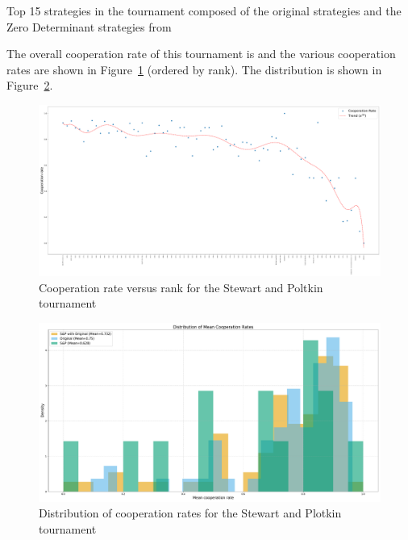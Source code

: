 \documentclass{article}
\begin{document}
\begin{table}[!hbtp]
        \centering
        \scriptsize
        
        \caption{Top 15 strategies in the tournament composed of the original
                 strategies and the Zero Determinant strategies
                 from~\cite{Stewart2012}}
        \label{tbl:sp_tournament_rankings}
\end{table}

The overall cooperation rate of this tournament is
and the various
cooperation rates are shown in
Figure~\ref{fig:sp_tournament_cooperation_rate_versus_rank} (ordered by rank).
The distribution is shown in Figure~\ref{fig:sp_tournament_cooperation_rates}.

\begin{figure}[!hbtp]
    \centering
    \includegraphics[width=.8\textwidth]{assets/sp_tournament_cooperation_rate_versus_rank.pdf}
    \caption{Cooperation rate versus rank for the Stewart and Poltkin tournament}
    \label{fig:sp_tournament_cooperation_rate_versus_rank}
\end{figure}


\begin{figure}[!hbtp]
    \centering
    \includegraphics[width=.8\textwidth]{assets/sp_tournament_cooperation_rates.pdf}
    \caption{Distribution of cooperation rates for the Stewart and Plotkin
    tournament}
    \label{fig:sp_tournament_cooperation_rates}
\end{figure}
\end{document}
